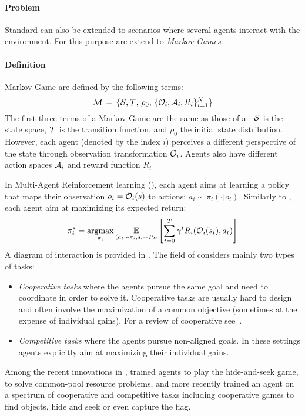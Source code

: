 \paragraph{Problem}

Standard \rl can also be extended to scenarios where several agents interact with the environment. For this purpose \mdps are extend to \textit{Markov Games}.
\begin{tcolorbox}
\small
\paragraph{Definition}
\gls{Markov Game} are defined by the following terms:
\begin{equation}
	\mathcal{M}\,=\,\{\mathcal{S},\mathcal{T},\,\rho_0,\,\{\mathcal{O}_i,\mathcal{A}_i,R_i\}_{i=1}^N\}
	\label{eq:standard_mdp}	
\end{equation}
The first three terms of a Markov Game are the same as those of a \mdp: $\mathcal{S}$ is the state space, $\mathcal{T}$ is the transition function, and $\rho_0$ the initial state distribution. However, each agent (denoted by the index $i$) perceives a different perspective of the state through observation transformation $\mathcal{O}_i$. Agents also have different action spaces $\mathcal{A}_i$ and reward function $R_i$
\end{tcolorbox}

In Multi-Agent Reinforcement learning (\marl), each agent aims at learning a policy that maps their observation $o_i=\mathcal{O}_i(s)$ to actions: $a_i \sim \pi_i(\cdot|o_i)$. Similarly to \rl, each agent aim at maximizing its expected return:
\begin{equation}
	\pi_i^* = \operatorname*{argmax}_{\pi_i} \underset{(a_t\sim\pi_i, s_t \sim P_E}{\mathbb{E}}\left[\sum_{t=0}^T\gamma^tR_i(\mathcal{O}_i(s_t),a_t)\right]
\end{equation}
A diagram of interaction is provided in . The field of \marl considers mainly two types of tasks:
\begin{itemize}[noitemsep]
\item \textit{Cooperative tasks} where the agents pursue the same goal and need to coordinate in order to solve it. Cooperative tasks are usually hard to design and often involve the maximization of a common objective (sometimes at the expense of individual gains). For a review of cooperative \marl see~\citet{OroojlooyJadid2019cooperative}.
\item \textit{Competitive tasks} where the agents pursue non-aligned goals. In these settings agents explicitly aim at maximizing their individual gains. 
\end{itemize}
Among the recent innovations in \marl, \citet{Baker2020Emergent} trained agents to play the hide-and-seek game, \citet{perolat2017commonpool} to solve common-pool resource problems, and more recently \citet{team2021open} trained an agent on a spectrum of cooperative and competitive tasks including cooperative games to find objects, hide and seek or even capture the flag.

